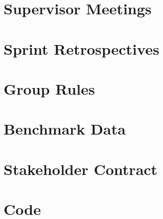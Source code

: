 \documentclass[BSP,english,oneside]{ntnuthesis/ntnubachelorthesis}
\begin{document}
\chapter{Supervisor Meetings}
\chapter{Sprint Retrospectives}
\chapter{Group Rules}
\chapter{Benchmark Data}
\chapter{Stakeholder Contract}
\chapter{Code}
\end{document}
